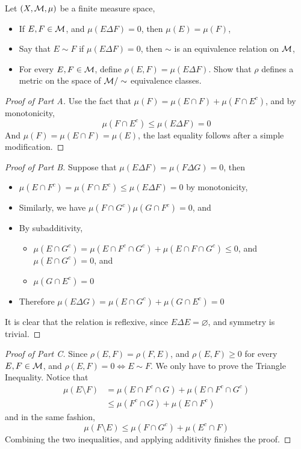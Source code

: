 \documentclass[../../main.tex]{subfiles}
\begin{document}
%

\begin{wts}
Let $(X,\mathcal{M},\mu)$ be a finite measure space,
\begin{itemize}
    \item If $E,F\in\mathcal{M}$, and $\mu(E\Delta F)=0$, then $\mu(E)=\mu(F)$,
    \item Say that $E\sim F$ if $\mu(E\Delta F)=0$, then $\sim$ is an equivalence relation on $\mathcal{M}$,
    \item For every $E,F\in\mathcal{M}$, define $\rho(E,F)=\mu(E\Delta F)$. Show that $\rho$ defines a metric on the space of $\mathcal{M}/\sim$ equivalence classes.
\end{itemize}
\end{wts}
\begin{proof}[Proof of Part A]
    Use the fact that $\mu(F)=\mu(E\cap F)+\mu(F\cap E^c)$, and by monotonicity,
    \[
    \mu(F\cap E^c)\leq \mu(E\Delta F)=0
    \]
    And $\mu(F)=\mu(E\cap F)=\mu(E)$, the last equality follows after a simple modification.
\end{proof}
\begin{proof}[Proof of Part B]
    Suppose that $\mu(E\Delta F)=\mu(F\Delta G)=0$, then
    \begin{itemize}
        \item $\mu(E\cap F^c)=\mu(F\cap E^c)\leq \mu(E\Delta F)=0$ by monotonicity,
        \item Similarly, we have $\mu(F\cap G^c)\mu(G\cap F^c)=0$, and
        \item By subadditivity, 
        \begin{itemize}
            \item $\mu(E\cap G^c)=\mu(E\cap F^c\cap G^c) + \mu(E\cap F\cap G^c)\leq 0$, and $\mu(E\cap G^c)=0$, and
            \item $\mu(G\cap E^c)=0$
        \end{itemize}
        \item Therefore $\mu(E\Delta G)=\mu(E\cap G^c) + \mu(G\cap E^c)=0$
    \end{itemize}
    It is clear that the relation is reflexive, since $E\Delta E =\varnothing$, and symmetry is trivial.
\end{proof}
\begin{proof}[Proof of Part C]
    Since $\rho(E,F)=\rho(F,E)$, and $\rho(E,F)\geq 0$ for every $E,F\in\mathcal{M}$, and $\rho(E,F)=0\iff E\sim F$. We only have to prove the Triangle Inequality. Notice that
    \begin{align*}
    \mu(E\setminus F) &= \mu(E\cap F^c\cap G) + \mu(E\cap F^c\cap G^c)\\
    &\leq \mu(F^c\cap G) + \mu(E\cap F^c)
    \end{align*}
    and in the same fashion,
    \[
    \mu(F\setminus E) \leq \mu(F\cap G^c) + \mu(E^c\cap F)
    \]
    Combining the two inequalities, and applying additivity finishes the proof.
\end{proof}
\newpage
\end{document}
